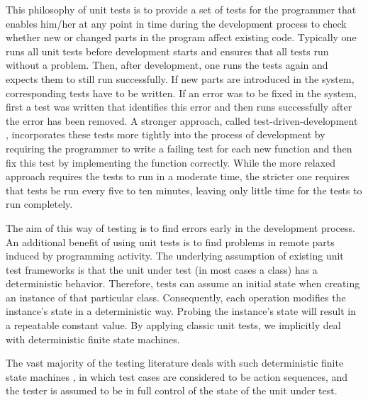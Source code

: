 This philosophy of unit tests is to provide a set of tests for the programmer 
that enables him/her at any point in time during the development process to 
check whether new or changed parts in the program affect existing code. 
Typically one runs all unit tests before development starts and ensures that 
all tests run without a problem. Then, after development, one runs the tests 
again and expects them to still run successfully. If new parts are introduced 
in the system, corresponding tests have to be written. If an error was to be 
fixed in the system, first a test was written that identifies this error and 
then runs successfully after the error has been removed. A stronger approach, 
called test-driven-development \cite{beck:2003}, incorporates these tests more 
tightly into the process of development by requiring the programmer to write a 
failing test for each new function and then fix this test by implementing the 
function correctly. While the more relaxed
approach requires the tests to run in a 
moderate time, the stricter one
requires that tests be run every five to ten 
minutes, leaving only little time for the tests to run completely.

The aim of this way of testing is to find errors early in the development 
process. An additional benefit of using unit tests is to find problems in 
remote parts induced by programming activity. The underlying assumption of 
existing unit test frameworks is that the unit under test (in most cases a 
class) has a deterministic behavior. Therefore, tests can assume an initial 
state when creating an instance of that particular class. Consequently, each 
operation modifies the instance's state in a deterministic way. Probing the 
instance's state will result in a repeatable constant value. By applying 
classic unit tests, 
we implicitly deal with deterministic finite state machines.

The vast majority of the testing literature deals with such deterministic
finite state machines \cite{lee:1996,yannakakis:1991,sidhu:1989}, in which
test cases are considered to be action sequences, and the tester is assumed
to be in full control of the state of the unit under test.
